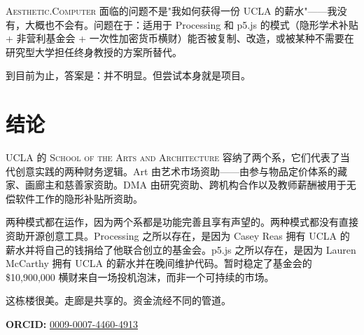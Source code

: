 \documentclass[10pt,letterpaper,twocolumn]{article}
\newcommand{\ac}{\textsc{Aesthetic.Computer}}
\newcommand{\dma}{\textsc{DMA}}
\newcommand{\sofa}{\textsc{School of the Arts and Architecture}}
\begin{document}
\ac{} 面临的问题不是"我如何获得一份 UCLA 的薪水"——我没有，大概也不会有。问题在于：适用于 Processing 和 p5.js 的模式（隐形学术补贴 + 非营利基金会 + 一次性加密货币横财）能否被复制、改造，或被某种不需要在研究型大学担任终身教授的方案所替代。

到目前为止，答案是：并不明显。但尝试本身就是项目。

\section{结论}

UCLA 的 \sofa{} 容纳了两个系，它们代表了当代创意实践的两种财务逻辑。Art 由艺术市场资助——由参与物品定价体系的藏家、画廊主和慈善家资助。\dma{} 由研究资助、跨机构合作以及教师薪酬被用于无偿软件工作的隐形补贴所资助。

两种模式都在运作，因为两个系都是功能完善且享有声望的。两种模式都没有直接资助开源创意工具。Processing 之所以存在，是因为 Casey Reas 拥有 UCLA 的薪水并将自己的钱捐给了他联合创立的基金会。p5.js 之所以存在，是因为 Lauren McCarthy 拥有 UCLA 的薪水并在晚间维护代码。暂时稳定了基金会的 \$10{,}900{,}000 横财来自一场投机泡沫，而非一个可持续的市场。

这栋楼很美。走廊是共享的。资金流经不同的管道。

\vspace{0.5em}
\noindent\textbf{ORCID:} \href{https://orcid.org/0009-0007-4460-4913}{0009-0007-4460-4913}



\end{document}

